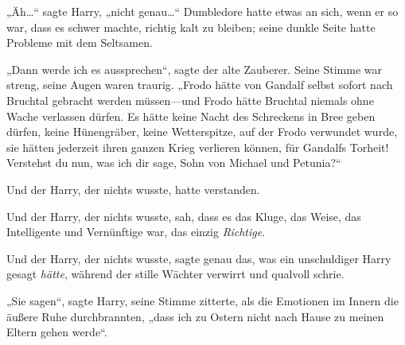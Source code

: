 „Äh…“ sagte Harry, „nicht genau…“ Dumbledore hatte etwas an sich, wenn er so war, dass es schwer machte, richtig kalt zu bleiben; seine dunkle Seite hatte Probleme mit dem Seltsamen.

„Dann werde ich es aussprechen“, sagte der alte Zauberer. Seine Stimme war streng, seine Augen waren traurig.
„Frodo hätte von Gandalf selbst sofort nach Bruchtal gebracht werden müssen—und Frodo hätte Bruchtal niemals ohne Wache verlassen dürfen. Es hätte keine Nacht des Schreckens in Bree geben dürfen, keine Hünengräber, keine Wetterspitze, auf der Frodo verwundet wurde, sie hätten jederzeit ihren ganzen Krieg verlieren können, für Gandalfs Torheit! Verstehst du nun, was ich dir sage, Sohn von Michael und Petunia?“

Und der Harry, der nichts wusste, hatte verstanden.

Und der Harry, der nichts wusste, sah, dass es das Kluge, das Weise, das Intelligente und Vernünftige war, das einzig \emph{Richtige}.

Und der Harry, der nichts wusste, sagte genau das, was ein unschuldiger Harry gesagt \emph{hätte}, während der stille Wächter verwirrt und qualvoll schrie.

„Sie sagen“, sagte Harry, seine Stimme zitterte, als die Emotionen im Innern die äußere Ruhe durchbrannten, „dass ich zu Ostern nicht nach Hause zu meinen Eltern gehen werde“.

